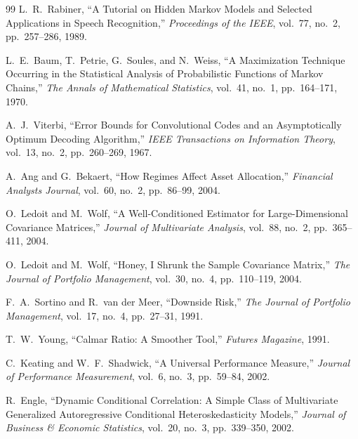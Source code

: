 \documentclass[12pt,a4paper]{article}
\begin{document}
\begin{thebibliography}{99}
L.~R.~Rabiner, ``A Tutorial on Hidden Markov Models and Selected Applications in Speech Recognition,''
\emph{Proceedings of the IEEE}, vol.~77, no.~2, pp.~257--286, 1989.

L.~E.~Baum, T.~Petrie, G.~Soules, and N.~Weiss,
``A Maximization Technique Occurring in the Statistical Analysis of Probabilistic Functions of Markov Chains,''
\emph{The Annals of Mathematical Statistics}, vol.~41, no.~1, pp.~164--171, 1970.

A.~J.~Viterbi, ``Error Bounds for Convolutional Codes and an Asymptotically Optimum Decoding Algorithm,''
\emph{IEEE Transactions on Information Theory}, vol.~13, no.~2, pp.~260--269, 1967.

A.~Ang and G.~Bekaert, ``How Regimes Affect Asset Allocation,''
\emph{Financial Analysts Journal}, vol.~60, no.~2, pp.~86--99, 2004.

O.~Ledoit and M.~Wolf, ``A Well-Conditioned Estimator for Large-Dimensional Covariance Matrices,''
\emph{Journal of Multivariate Analysis}, vol.~88, no.~2, pp.~365--411, 2004.

O.~Ledoit and M.~Wolf, ``Honey, I Shrunk the Sample Covariance Matrix,''
\emph{The Journal of Portfolio Management}, vol.~30, no.~4, pp.~110--119, 2004.

F.~A.~Sortino and R.~van der Meer, ``Downside Risk,''
\emph{The Journal of Portfolio Management}, vol.~17, no.~4, pp.~27--31, 1991.

T.~W.~Young, ``Calmar Ratio: A Smoother Tool,''
\emph{Futures Magazine}, 1991.

C.~Keating and W.~F.~Shadwick, ``A Universal Performance Measure,''
\emph{Journal of Performance Measurement}, vol.~6, no.~3, pp.~59--84, 2002.

R.~Engle, ``Dynamic Conditional Correlation: A Simple Class of Multivariate Generalized Autoregressive Conditional Heteroskedasticity Models,''
\emph{Journal of Business \& Economic Statistics}, vol.~20, no.~3, pp.~339--350, 2002.

\end{thebibliography}
\end{document}
